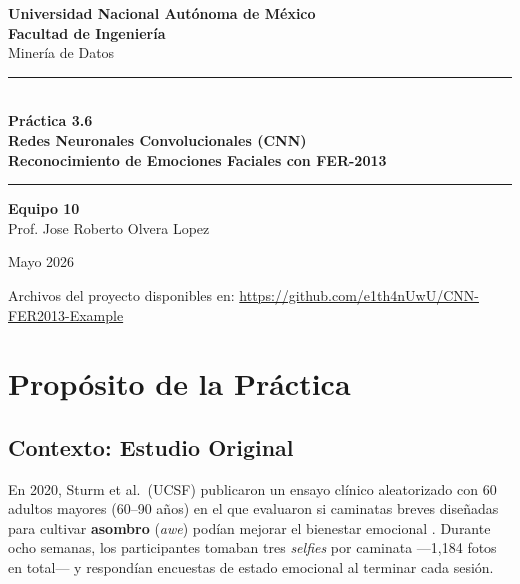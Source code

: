 \documentclass[12pt, a4paper]{article}
\begin{document}
\begin{titlepage}
  \centering
  \vspace*{1.5cm}

  {\Large\bfseries Universidad Nacional Autónoma de México\\[0.3em]
  Facultad de Ingeniería}\\[0.8em]
  {\large Minería de Datos}

  \vspace{2cm}
  \rule{\linewidth}{0.6pt}\\[0.6em]
  {\LARGE\bfseries Práctica 3.6\\[0.4em]
  Redes Neuronales Convolucionales (CNN)\\[0.3em]
  \large Reconocimiento de Emociones Faciales con FER-2013}\\[0.4em]
  \rule{\linewidth}{0.6pt}

  \vspace{2cm}

  {\large\textbf{Equipo 10}}\\[0.5em]
  {\large Prof. Jose Roberto Olvera Lopez}\\[1.5em]

  \vspace{2cm}

  {\large Mayo 2026}

  \vfill
  {\small Archivos del proyecto disponibles en: \url{https://github.com/e1th4nUwU/CNN-FER2013-Example}}
\end{titlepage}

\tableofcontents
\newpage

\section{Propósito de la Práctica}

\subsection{Contexto: Estudio Original}

En 2020, Sturm et al.\ (UCSF) publicaron un ensayo clínico aleatorizado con 60 adultos mayores
(60–90 años) en el que evaluaron si caminatas breves diseñadas para cultivar \textbf{asombro}
(\textit{awe}) podían mejorar el bienestar emocional \cite{sturm2022}. Durante ocho semanas,
los participantes tomaban tres \textit{selfies} por caminata —1,184 fotos en total— y respondían
encuestas de estado emocional al terminar cada sesión.
\end{document}
